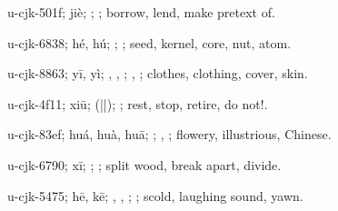 \begin{multicols}{2}
{\cjkgGlue{}u-cjk-501f; jiè; \cjkgGlue{}\cjkgGlue{}\cjkgGlue{}; \cjkgGlue{}; borrow, lend, make pretext of.

\cjkgGlue{}u-cjk-6838; hé, hú; \cjkgGlue{}; \cjkgGlue{}; seed, kernel, core, nut, atom.

\cjkgGlue{}u-cjk-8863; yī, yì; \cjkgGlue{}, \cjkgGlue{}, \cjkgGlue{}; \cjkgGlue{}, \cjkgGlue{}; clothes, clothing, cover, skin.

\cjkgGlue{}u-cjk-4f11; xiū; \cjkgGlue{}\cjkgGlue{}(\cjkgGlue{}|\cjkgGlue{}|\cjkgGlue{}); \cjkgGlue{}; rest, stop, retire, do not!.

\cjkgGlue{}u-cjk-83ef; huá, huà, huā; \cjkgGlue{}; \cjkgGlue{}, \cjkgGlue{}; flowery, illustrious, Chinese.

\cjkgGlue{}u-cjk-6790; xī; \cjkgGlue{}; \cjkgGlue{}; split wood, break apart, divide.

\cjkgGlue{}u-cjk-5475; hē, kē; \cjkgGlue{}\cjkgGlue{}\cjkgGlue{}, \cjkgGlue{}\cjkgGlue{}\cjkgGlue{}, \cjkgGlue{}\cjkgGlue{}\cjkgGlue{}; \cjkgGlue{}; scold, laughing sound, yawn.

}
\end{multicols}
